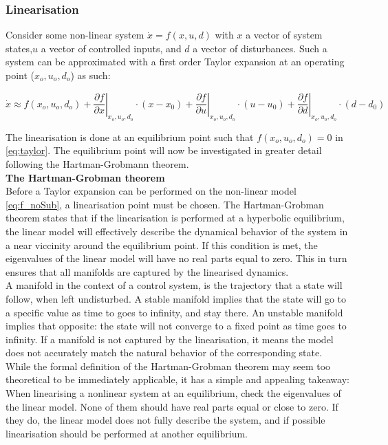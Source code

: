 \subsubsection{Linearisation}
Consider some non-linear system $\dot{x} = f(x,u,d)$ with $ x $ a vector of system states,$  u $ a vector of controlled inputs, and $ d $ a vector of disturbances. Such a system can be approximated with a first order Taylor expansion at an operating point ($x_o, u_o, d_o$) as such:

\begin{equation} \label{eq:taylor}
	\dot{x}   \approx   f(x_o, u_o, d_o)   +
	\left. \dfrac{\partial f}{\partial x} \right |_{x_o, u_o, d_o} \cdot (x-x_0) +
	\left. \dfrac{\partial f}{\partial u} \right |_{x_o, u_o, d_o} \cdot (u-u_0) +
	\left. \dfrac{\partial f}{\partial d} \right |_{x_o, u_o, d_o} \cdot (d-d_0)
\end{equation}

The linearisation is done at an equilibrium point such that $f(x_o, u_o, d_o) = 0$ in \cref{eq:taylor}. The equilibrium point will now be investigated in greater detail following the Hartman-Grobmann theorem.\\

\textbf{The Hartman-Grobman theorem}\\
Before a Taylor expansion can be performed on the non-linear model \cref{eq:f_noSub}, a linearisation point must be chosen. The Hartman-Grobman theorem states that if the linearisation is performed at a hyperbolic equilibrium, the linear model will effectively describe the dynamical behavior of the system in a near viccinity around the equilibrium point. If this condition is met, the eigenvalues of the linear model will have no real parts equal to zero. This in turn ensures that all manifolds are captured by the linearised dynamics. \\
A manifold in the context of a control system, is the trajectory that a state will follow, when left undisturbed. A stable manifold implies that the state will go to a specific value as time to goes to infinity, and stay there. An unstable manifold implies that opposite: the state will not converge to a fixed point as time goes to infinity. If a manifold is not captured by the linearisation, it means the model does not accurately match the natural behavior of the corresponding state.\\

While the formal definition of the Hartman-Grobman theorem may seem too theoretical to be immediately applicable, it has a simple and appealing takeaway: When linearising a nonlinear system at an equilibrium, check the eigenvalues of the linear model. None of them should have real parts equal or close to zero. If they do, the linear model does not fully describe the system, and if possible linearisation should be performed at another equilibrium.


